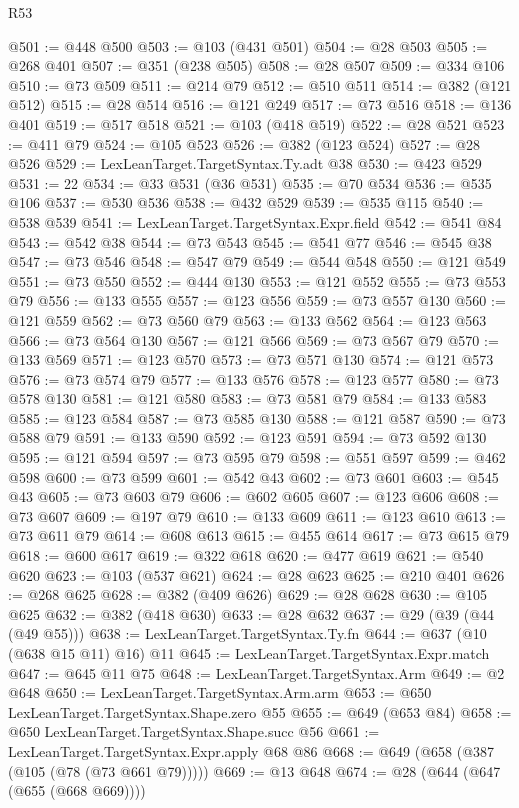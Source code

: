\begin{lexlean}{R53}
\begin{coremodule}
@501 := @448 @500
@503 := @103 (@431 @501)
@504 := @28 @503
@505 := @268 @401
@507 := @351 (@238 @505)
@508 := @28 @507
@509 := @334 @106
@510 := @73 @509
@511 := @214 @79
@512 := @510 @511
@514 := @382 (@121 @512)
@515 := @28 @514
@516 := @121 @249
@517 := @73 @516
@518 := @136 @401
@519 := @517 @518
@521 := @103 (@418 @519)
@522 := @28 @521
@523 := @411 @79
@524 := @105 @523
@526 := @382 (@123 @524)
@527 := @28 @526
@529 := LexLeanTarget.TargetSyntax.Ty.adt @38
@530 := @423 @529
@531 := 22
@534 := @33 @531 (@36 @531)
@535 := @70 @534
@536 := @535 @106
@537 := @530 @536
@538 := @432 @529
@539 := @535 @115
@540 := @538 @539
@541 := LexLeanTarget.TargetSyntax.Expr.field
@542 := @541 @84
@543 := @542 @38
@544 := @73 @543
@545 := @541 @77
@546 := @545 @38
@547 := @73 @546
@548 := @547 @79
@549 := @544 @548
@550 := @121 @549
@551 := @73 @550
@552 := @444 @130
@553 := @121 @552
@555 := @73 @553 @79
@556 := @133 @555
@557 := @123 @556
@559 := @73 @557 @130
@560 := @121 @559
@562 := @73 @560 @79
@563 := @133 @562
@564 := @123 @563
@566 := @73 @564 @130
@567 := @121 @566
@569 := @73 @567 @79
@570 := @133 @569
@571 := @123 @570
@573 := @73 @571 @130
@574 := @121 @573
@576 := @73 @574 @79
@577 := @133 @576
@578 := @123 @577
@580 := @73 @578 @130
@581 := @121 @580
@583 := @73 @581 @79
@584 := @133 @583
@585 := @123 @584
@587 := @73 @585 @130
@588 := @121 @587
@590 := @73 @588 @79
@591 := @133 @590
@592 := @123 @591
@594 := @73 @592 @130
@595 := @121 @594
@597 := @73 @595 @79
@598 := @551 @597
@599 := @462 @598
@600 := @73 @599
@601 := @542 @43
@602 := @73 @601
@603 := @545 @43
@605 := @73 @603 @79
@606 := @602 @605
@607 := @123 @606
@608 := @73 @607
@609 := @197 @79
@610 := @133 @609
@611 := @123 @610
@613 := @73 @611 @79
@614 := @608 @613
@615 := @455 @614
@617 := @73 @615 @79
@618 := @600 @617
@619 := @322 @618
@620 := @477 @619
@621 := @540 @620
@623 := @103 (@537 @621)
@624 := @28 @623
@625 := @210 @401
@626 := @268 @625
@628 := @382 (@409 @626)
@629 := @28 @628
@630 := @105 @625
@632 := @382 (@418 @630)
@633 := @28 @632
@637 := @29 (@39 (@44 (@49 @55)))
@638 := LexLeanTarget.TargetSyntax.Ty.fn
@644 := @637 (@10 (@638 @15 @11) @16) @11
@645 := LexLeanTarget.TargetSyntax.Expr.match
@647 := @645 @11 @75
@648 := LexLeanTarget.TargetSyntax.Arm
@649 := @2 @648
@650 := LexLeanTarget.TargetSyntax.Arm.arm
@653 := @650 LexLeanTarget.TargetSyntax.Shape.zero @55
@655 := @649 (@653 @84)
@658 := @650 LexLeanTarget.TargetSyntax.Shape.succ @56
@661 := LexLeanTarget.TargetSyntax.Expr.apply @68 @86
@668 := @649 (@658 (@387 (@105 (@78 (@73 @661 @79)))))
@669 := @13 @648
@674 := @28 (@644 (@647 (@655 (@668 @669))))

\end{coremodule}
\end{lexlean}
